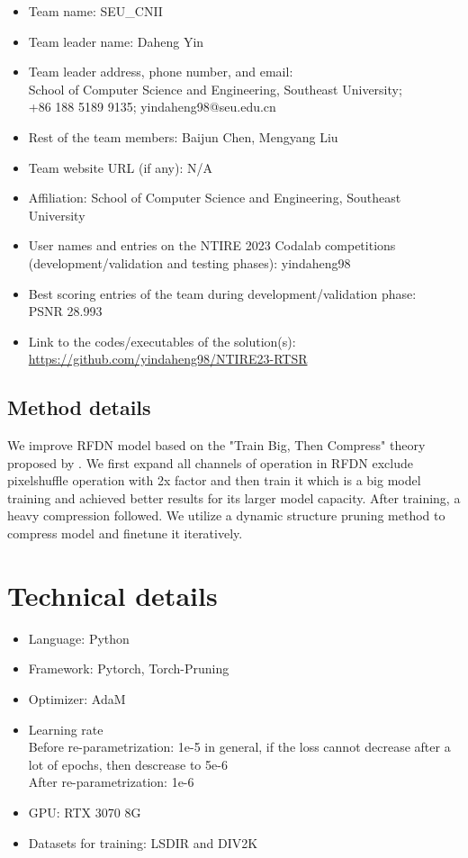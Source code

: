 \documentclass[10pt,twocolumn,letterpaper]{article}
\begin{document}
\begin{itemize}
\item Team name: SEU\_CNII
\item Team leader name: Daheng Yin
\item Team leader address, phone number, and email: \\School of Computer Science and Engineering, Southeast University; \\+86 188 5189 9135; yindaheng98@seu.edu.cn
\item Rest of the team members: Baijun Chen, Mengyang Liu
\item Team website URL (if any): N/A
\item Affiliation: School of Computer Science and Engineering, Southeast University
\item User names and entries on the NTIRE 2023 Codalab competitions (development/validation and testing phases): yindaheng98
\item Best scoring entries of the team during development/validation phase:\\PSNR 28.993
\item Link to the codes/executables of the solution(s): \url{https://github.com/yindaheng98/NTIRE23-RTSR}
\end{itemize}

\subsection{Method details}

We improve RFDN\cite{liu2020residual} model based on the "Train Big, Then Compress" theory proposed by \cite{li2020trainlarge}.
We first expand all channels of operation in RFDN exclude pixelshuffle operation with 2x factor and then train it which is a big model training and achieved better results for its larger model capacity.
After training, a heavy compression followed.
We utilize a dynamic structure pruning method\cite{fang2023depgraph} to compress model and finetune it iteratively.


\section{Technical details}
\begin{itemize}
    \item Language: Python
    \item Framework: Pytorch, Torch-Pruning\cite{fang2023depgraph}
    \item Optimizer: AdaM
    \item Learning rate\\Before re-parametrization: 1e-5 in general, if the loss cannot decrease after a lot of epochs, then descrease to 5e-6\\After re-parametrization: 1e-6
    \item GPU: RTX 3070 8G
    \item Datasets for training: LSDIR and DIV2K
\end{itemize}
\end{document}
